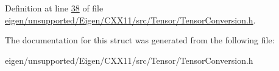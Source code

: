 Definition at line \hyperlink{eigen_2unsupported_2_eigen_2_c_x_x11_2src_2_tensor_2_tensor_conversion_8h_source_l00038}{38} of file \hyperlink{eigen_2unsupported_2_eigen_2_c_x_x11_2src_2_tensor_2_tensor_conversion_8h_source}{eigen/unsupported/\+Eigen/\+C\+X\+X11/src/\+Tensor/\+Tensor\+Conversion.\+h}.



The documentation for this struct was generated from the following file\+:\begin{DoxyCompactItemize}
\item 
eigen/unsupported/\+Eigen/\+C\+X\+X11/src/\+Tensor/\+Tensor\+Conversion.\+h\end{DoxyCompactItemize}

